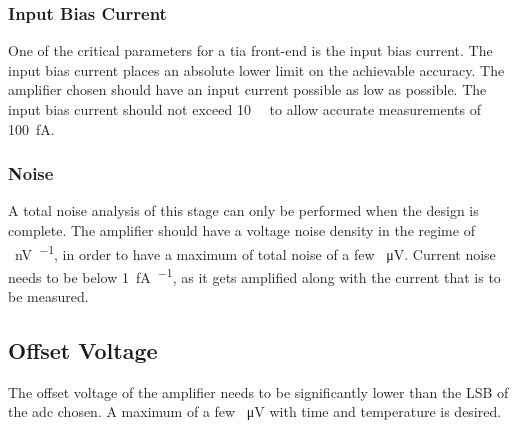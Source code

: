 \subsubsection*{Input Bias Current}
One of the critical parameters for a \ac{tia} front-end is the input bias current. The input bias current places an absolute lower limit on the achievable accuracy. The amplifier chosen should have an input current possible as low as possible. The input bias current should not exceed \SI{10}{\femto\amp} to allow accurate measurements of \SI{100}{\femto\ampere}.
\subsubsection*{Noise}
A total noise analysis of this stage can only be performed when the design is complete. The amplifier should have a voltage noise density in the regime of \SI[per-mode=symbol]{}{\nano\volt\per\sqhz}, in order to have a maximum of total noise of a few \SI{}{\micro\volt}. Current noise needs to be below \SI[per-mode=symbol]{1}{\femto\ampere\per\sqhz}, as it gets amplified along with the current that is to be measured.
\subsection*{Offset Voltage}
The offset voltage of the amplifier needs to be significantly lower than the \ac{LSB} of the \ac{adc} chosen. A maximum of a few \SI{}{\micro\volt} with time and temperature is desired.
 
